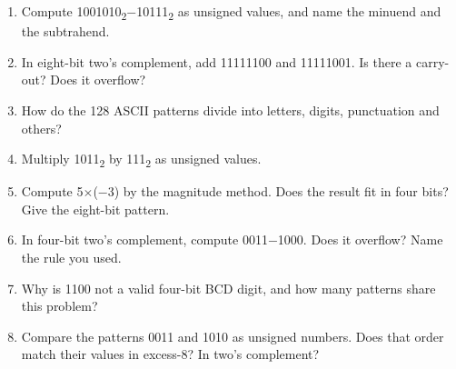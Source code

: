 \documentclass[11pt]{article}
\begin{document}
\begin{keepsection}
\begin{enumerate}
\item Compute 1001010\textsubscript{2}\ensuremath{-}10111\textsubscript{2} as unsigned values, and name the minuend and the subtrahend.
\item In eight-bit two’s complement, add 11111100 and 11111001. Is there a carry-out? Does it overflow?
\item How do the 128 ASCII patterns divide into letters, digits, punctuation and others?
\item Multiply 1011\textsubscript{2} by 111\textsubscript{2} as unsigned values.
\item Compute 5\ensuremath{\times}(\ensuremath{-}3) by the magnitude method. Does the result fit in four bits? Give the eight-bit pattern.
\item In four-bit two’s complement, compute 0011\ensuremath{-}1000. Does it overflow? Name the rule you used.
\item Why is 1100 not a valid four-bit BCD digit, and how many patterns share this problem?
\item Compare the patterns 0011 and 1010 as unsigned numbers. Does that order match their values in excess-8? In two’s complement?
\end{enumerate}

\end{keepsection}
\end{document}
